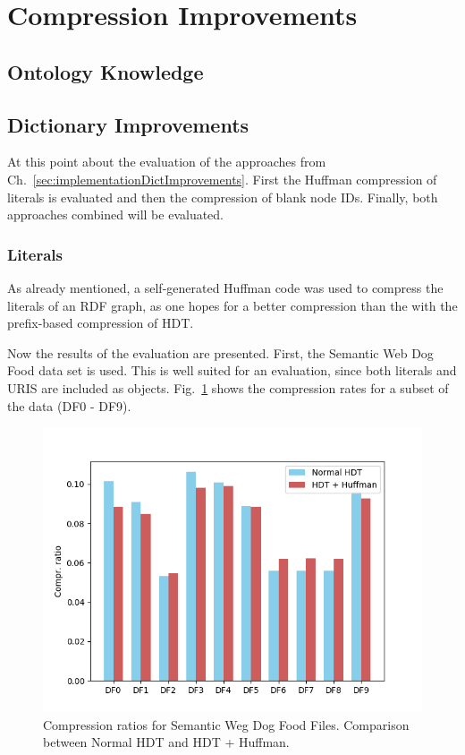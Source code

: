 \section{Compression Improvements}

\subsection{Ontology Knowledge}\label{sec:evaluationOntKnowledge}

\subsection{Dictionary Improvements}\label{sec:evaluationDictImprovements}

At this point  about the evaluation of the approaches from Ch.~\ref{sec:implementationDictImprovements}. First the Huffman compression of literals is evaluated and then the compression of blank node IDs. Finally, both approaches combined will be evaluated.


\subsubsection{Literals}

As already mentioned, a self-generated Huffman code was used to compress the literals of an RDF graph, as one hopes for a better compression than the with the prefix-based compression of HDT.

Now the results of the evaluation are presented. First, the Semantic Web Dog Food data set is used. This is well suited for an evaluation, since both literals and URIS are included as objects. Fig.~\ref{fig:dogfoodcomprratios} shows the compression rates for a subset of the data (DF0 - DF9). 


\begin{figure}
	\centering
	\includegraphics[width=0.7\linewidth]{figures/4_evaluation/dogFoodComprRatios}
	\caption{Compression ratios for Semantic Weg Dog Food Files. Comparison between Normal HDT and HDT + Huffman.}
	\label{fig:dogfoodcomprratios}
\end{figure}

